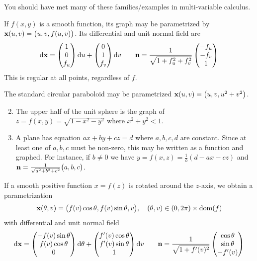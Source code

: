 
You should have met many of these families/examples in multi-variable calculus.

 If $f(x,y)$ is a smooth function, its graph may be parametrized by ${\mathbf{x}}(u,v)=\bigl(u,v,f(u,v)\bigr)$. Its differential and unit normal field are
	\[
		\mathrm{d}{\mathbf{x}}=\begin{pmatrix}1\\0\\f_u\end{pmatrix}{\mathrm{d}u}+\begin{pmatrix}0\\1\\f_v\end{pmatrix}{\mathrm{d}v}\qquad {\mathbf{n}}=\frac 1{\sqrt{1+f_u^2+f_v^2}}\begin{pmatrix}-f_u\\-f_v\\1\end{pmatrix}
	\]
	This is regular at all points, regardless of $f$.


\begin{examples}{}{}
	\exstart The standard circular paraboloid may be parametrized ${\mathbf{x}}(u,v)=\bigl(u,v,u^2+v^2\bigr)$.
	\begin{enumerate}\setcounter{enumi}{1}
	  \item The upper half of the unit sphere is the graph of $z=f(x,y)=\sqrt{1-x^2-y^2}$ where $x^2+y^2<1$.
	  
	  \item A plane has equation $ax+by+cz=d$ where $a,b,c,d$ are constant. Since at least one of $a,b,c$ must be non-zero, this may be written as a function and graphed. For instance, if $b\neq 0$ we have $y=f(x,z)=\frac 1b(d-ax-cz)$ and ${\mathbf{n}}=\frac 1{\sqrt{a^2+b^2+c^2}}\bigl(a,b,c\bigr)$.
	\end{enumerate}
\end{examples}


 If a smooth positive function $x=f(z)$ is rotated around the $z$-axis, we obtain a parametrization
	\[
		{\mathbf{x}}(\theta,v)=\bigl(f(v)\cos\theta,f(v)\sin\theta,v\bigr),\quad (\theta,v)\in(0,2\pi)\times\operatorname{dom}(f)
	\]
	with differential and unit normal field
	\begin{gather*}
		\mathrm{d}{\mathbf{x}} =\begin{pmatrix}-f(v)\sin\theta\\f(v)\cos\theta\\0\end{pmatrix}{\mathrm{d}\theta}+\begin{pmatrix}f'(v)\cos\theta\\f'(v)\sin\theta\\1\end{pmatrix}{\mathrm{d}v}\qquad {\mathbf{n}} =\frac 1{\sqrt{1+f'(v)^2}}\begin{pmatrix}\cos\theta\\\sin\theta\\-f'(v)\end{pmatrix}
	\end{gather*}


